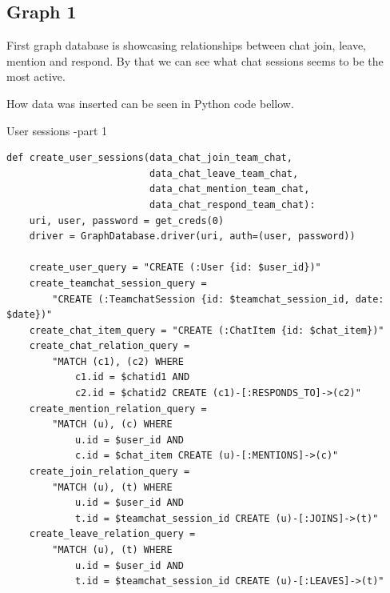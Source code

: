 \subsection{Graph 1}\label{Graph1}

First graph database is showcasing relationships between chat join, leave, mention and respond. By that we can see what chat sessions seems to be the most active.

How data was inserted can be seen in Python code bellow.
\begin{listing}[H]
\caption{User sessions -part 1}
\begin{verbatim}
def create_user_sessions(data_chat_join_team_chat, 
                         data_chat_leave_team_chat, 
                         data_chat_mention_team_chat, 
                         data_chat_respond_team_chat):
    uri, user, password = get_creds(0)
    driver = GraphDatabase.driver(uri, auth=(user, password))

    create_user_query = "CREATE (:User {id: $user_id})"
    create_teamchat_session_query = 
        "CREATE (:TeamchatSession {id: $teamchat_session_id, date: $date})"
    create_chat_item_query = "CREATE (:ChatItem {id: $chat_item})"
    create_chat_relation_query = 
        "MATCH (c1), (c2) WHERE 
            c1.id = $chatid1 AND 
            c2.id = $chatid2 CREATE (c1)-[:RESPONDS_TO]->(c2)"
    create_mention_relation_query = 
        "MATCH (u), (c) WHERE 
            u.id = $user_id AND 
            c.id = $chat_item CREATE (u)-[:MENTIONS]->(c)"
    create_join_relation_query = 
        "MATCH (u), (t) WHERE 
            u.id = $user_id AND 
            t.id = $teamchat_session_id CREATE (u)-[:JOINS]->(t)"
    create_leave_relation_query = 
        "MATCH (u), (t) WHERE 
            u.id = $user_id AND 
            t.id = $teamchat_session_id CREATE (u)-[:LEAVES]->(t)"
\end{verbatim}
\end{listing}


